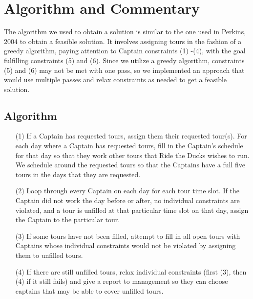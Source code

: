 \documentclass[12pt]{article}
\begin{document}
\section*{Algorithm and Commentary}
The algorithm we used to obtain a solution is similar to the one used in Perkins, 2004 to obtain a feasible solution. It involves assigning tours in the fashion of a greedy algorithm, paying attention to Captain constraints (1) -(4), with the goal fulfilling constraints (5) and (6). Since we utilize a greedy algorithm, constraints (5) and (6) may not be met with one pass, so we implemented an approach that would use multiple passes and relax constraints as needed to get a feasible solution. 

\subsection*{Algorithm}
\begin{itemize}
\item[(1)] If a Captain has requested tours, assign them their requested tour(s). For each day where a Captain has requested tours, fill in the Captain’s schedule for that day so that they work other tours that Ride the Ducks wishes to run. We schedule around the requested tours so that the Captains have a full five tours in the days that they are requested.

\item[(2)] Loop through every Captain on each day for each tour time slot. If the Captain did not work the day before or after, no individual constraints are violated, and a tour is unfilled at that particular time slot on that day, assign the Captain to the particular tour.

\item[(3)] If some tours have not been filled, attempt to fill in all open tours with Captains whose individual constraints would not be violated by assigning them to unfilled tours.

\item[(4)] If there are still unfilled tours, relax individual constraints  (first (3), then (4) if it still fails) and give a report to management so they can choose captains that may be able to cover unfilled tours.

\end{itemize}
\end{document}
